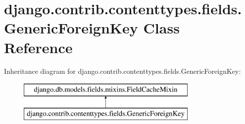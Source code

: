 \hypertarget{classdjango_1_1contrib_1_1contenttypes_1_1fields_1_1_generic_foreign_key}{}\section{django.\+contrib.\+contenttypes.\+fields.\+Generic\+Foreign\+Key Class Reference}
\label{classdjango_1_1contrib_1_1contenttypes_1_1fields_1_1_generic_foreign_key}
Inheritance diagram for django.\+contrib.\+contenttypes.\+fields.\+Generic\+Foreign\+Key\+:\begin{figure}[H]
\begin{center}
\leavevmode
\includegraphics[height=2.000000cm]{classdjango_1_1contrib_1_1contenttypes_1_1fields_1_1_generic_foreign_key}
\end{center}
\end{figure}
